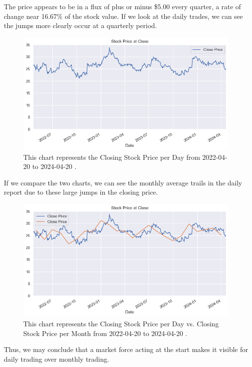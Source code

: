 \documentclass[9pt,a4paper,twoside]{tau}
\begin{document}
        The price appears to be in a flux of plus or minus \$5.00 every quarter, a rate of change near 16.67\% of the stock value. If we look at the daily trades, we can see the jumps more clearly occur at a quarterly period. 
            \begin{figure}[H]
                \centering
                \includegraphics[width=0.85\columnwidth]{Figures/CloseDataSet1d.png}
                \caption{This chart represents the Closing Stock Price per Day from 2022-04-20 to 2024-04-20 \cite{yahoo-finance-2024}.}
                \label{fig:figure}
            \end{figure}
        
        If we compare the two charts, we can see the monthly average trails in the daily report due to these large jumps in the closing price.
            \begin{figure}[H]
                \centering
                \includegraphics[width=0.85\columnwidth]{Figures/CloseDataSet1dvs1mo.png}
                \caption{This chart represents the Closing Stock Price per Day vs. Closing Stock Price per Month from 2022-04-20 to 2024-04-20 \cite{yahoo-finance-2024}.}
                \label{fig:figure}
            \end{figure}
        
        Thus, we may conclude that a market force acting at the start makes it visible for daily trading over monthly trading.
        
\end{document}
